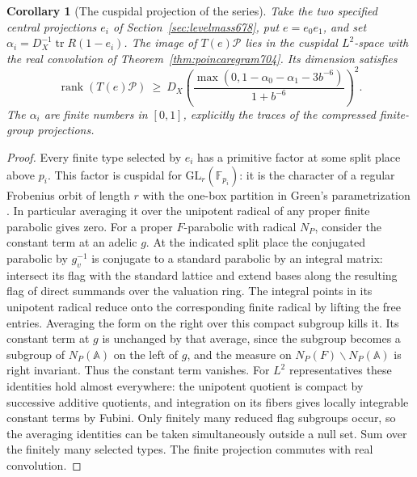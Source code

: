\documentclass[a4paper,11pt]{article}
\newtheorem{corollary}[proposition]{Corollary}
\theoremstyle{definition}
\theoremstyle{remark}
\numberwithin{equation}{section}
\begin{document}
\begin{corollary}[The cuspidal projection of the series]\leavevmode
\label{cor:cuspprojection704}
Take the two specified central projections \(e_i\) of
Section~\ref{sec:levelmass678}, put \(e=e_0e_1\), and set
\(\alpha_i=D_X^{-1}\operatorname{tr}R(1-e_i)\).
The image of \(T(e)\mathcal P\) lies in the cuspidal
\(L^2\)-space with the real convolution of
Theorem~\ref{thm:poincaregram704}. Its dimension satisfies
\[
    \operatorname{rank}(T(e)\mathcal P)\ \ge\
    D_X\left(\frac{\max(0,1-\alpha_0-\alpha_1-3b^{-6})}
                      {1+b^{-6}}\right)^2 .
\]
The \(\alpha_i\) are finite numbers in \([0,1]\), explicitly
the traces of the compressed finite-group projections.
\end{corollary}
\begin{proof}
Every finite type selected by \(e_i\) has a primitive factor
at some split place above \(p_i\). This factor is cuspidal
for \(\mathrm{GL}_r(\mathbb F_{p_i})\): it is the character
of a regular Frobenius orbit of length \(r\) with the one-box
partition in Green's parametrization
\cite[\S8]{XXV-XX-XX-green678}. In particular averaging it over the
unipotent radical of any proper finite parabolic gives zero.
For a proper \(F\)-parabolic with radical \(N_P\), consider
the constant term at an adelic \(g\). At the indicated split
place the conjugated parabolic by \(g_v^{-1}\) is conjugate
to a standard parabolic by an integral matrix: intersect
its flag with the standard lattice and extend bases along
the resulting flag of direct summands over the valuation
ring. The integral points in its unipotent radical reduce
onto the corresponding finite radical by lifting the free
entries. Averaging the form on the right over this compact
subgroup kills it. Its constant term at \(g\) is unchanged
by that average, since the subgroup becomes a subgroup of
\(N_P(\mathbb A)\) on the left of \(g\), and the measure on
\(N_P(F)\backslash N_P(\mathbb A)\) is right invariant.
Thus the constant term vanishes. For \(L^2\) representatives
these identities hold almost everywhere: the unipotent
quotient is compact by successive additive quotients, and
integration on its fibers gives locally integrable constant
terms by Fubini. Only finitely many reduced flag subgroups
occur, so the averaging identities can be taken simultaneously
outside a null set. Sum over the finitely many selected
types. The finite projection commutes with real convolution.


\end{proof}
\end{document}

